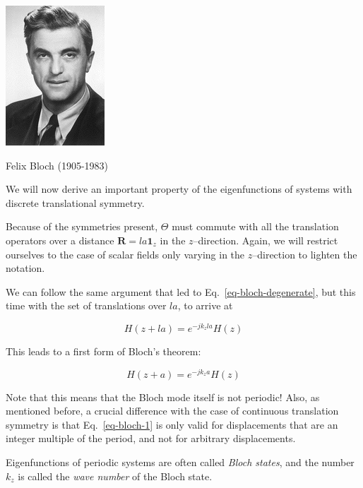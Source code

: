 \begin{marginfigure}[-0.0cm]
  \includegraphics{symmetry/figures/bloch}
  \caption{Felix Bloch (1905-1983)}
\end{marginfigure}

We will now derive an important property of the eigenfunctions of systems with discrete translational symmetry.

Because of the symmetries present, $\Theta$ must commute with all the translation operators over a distance ${\mathbf R} = l a {\mathbf 1}_z$ in the $z$--direction. Again, we will restrict ourselves to the case of scalar fields only varying in the $z$--direction to lighten the notation.

We can follow the same argument that led to Eq.~\ref{eq-bloch-degenerate}, but this time with the set of translations over $la$, to arrive at

\begin{equation}
H(z + la) = e^{-j k_z la} H(z)
\end{equation} 

This leads to a first form of Bloch's theorem:

\begin{equation}
H(z + a) = e^{-j k_z a} H(z) \label{eq-bloch-1}
\end{equation} 

Note that this means that the Bloch mode itself is not periodic! Also, as mentioned before, a crucial difference with the case of continuous translation symmetry is that Eq.~\ref{eq-bloch-1} is only valid for displacements that are an integer multiple of the period, and not for arbitrary displacements.

\noindent{}Eigenfunctions of periodic systems are often called \emph{Bloch states}, and the number $k_z$ is called the \emph{wave number} of the Bloch state. 

